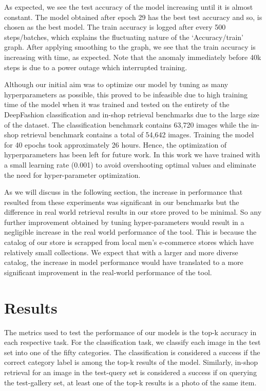 As expected, we see the test accuracy of the model increasing until it is almost constant. The model obtained after epoch 29 has the best test accuracy and so, is chosen as the best model. The train accuracy is logged after every 500 steps/batches, which explains the fluctuating nature of the ‘Accuracy/train’ graph. After applying smoothing to the graph, we see that the train accuracy is increasing with time, as expected. Note that the anomaly immediately before 40k steps is due to a power outage which interrupted training. 

Although our initial aim was to optimize our model by tuning as many hyperparameters as possible, this proved to be infeasible due to high training time of the model when it was trained and tested on the entirety of the DeepFashion classification and in-shop retrieval benchmarks due to the large size of the dataset. The classification benchmark contains 63,720 images while the in-shop retrieval benchmark contains a total of 54,642 images. Training the model for 40 epochs took approximately 26 hours. Hence, the optimization of hyperparameters has been left for future work. In this work we have trained with a small learning rate (0.001) to avoid overshooting optimal values and eliminate the need for hyper-parameter optimization. 

As we will discuss in the following section, the increase in performance that resulted from these experiments was significant in our benchmarks but the difference in real world retrieval results in our store proved to be minimal. So any further improvement obtained by tuning hyper-parameters would result in a negligible increase in the real world performance of the tool. This is because the catalog of our store is scrapped from local men’s e-commerce stores which have relatively small collections. We expect that with a larger and more diverse catalog, the increase in model performance would have translated to a more significant improvement in the real-world performance of the tool.\\

\section{Results}

The metrics used to test the performance of our models is the top-k accuracy in each respective task. For the classification task, we classify each image in the test set into one of the fifty categories. The classification is considered a success if the correct category label is among the top-k results of the model. Similarly, in-shop retrieval for an image in the test-query set is considered a success if on querying the test-gallery set, at least one of the top-k results is a photo of the same item.\newline

